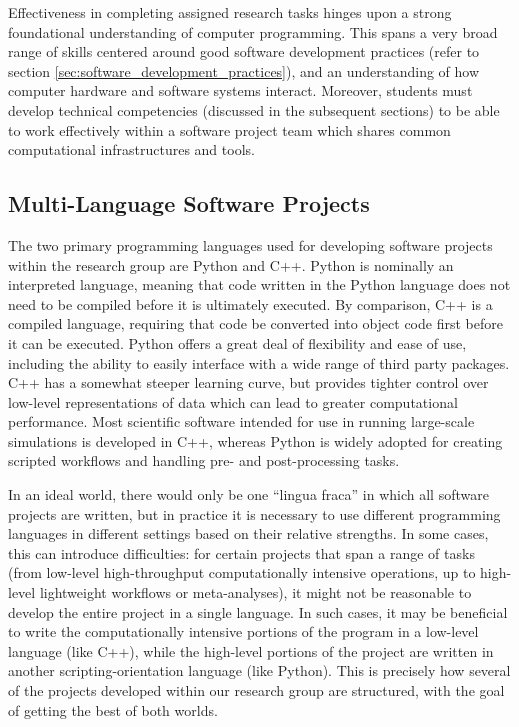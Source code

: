\documentclass[12pt,a4paper,article,oneside]{memoir} %
\begin{document}
Effectiveness in completing assigned research tasks hinges upon a strong foundational understanding of computer programming. This spans a very broad range of skills centered around good software development practices (refer to section \ref{sec:software_development_practices}), and an understanding of how computer hardware and software systems interact. Moreover, students must develop technical competencies (discussed in the subsequent sections) to be able to work effectively within a software project team which shares common computational infrastructures and tools.

\subsection{Multi-Language Software Projects}

The two primary programming languages used for developing software projects within the research group are Python and C++. Python is nominally an interpreted language, meaning that code written in the Python language does not need to be compiled before it is ultimately executed. By comparison, C++ is a compiled language, requiring that code be converted into object code first before it can be executed. Python offers a great deal of flexibility and ease of use, including the ability to easily interface with a wide range of third party packages. C++ has a somewhat steeper learning curve, but provides tighter control over low-level representations of data which can lead to greater computational performance. Most scientific software intended for use in running large-scale simulations is developed in C++, whereas Python is widely adopted for creating scripted workflows and handling pre- and post-processing tasks.

In an ideal world, there would only be one ``lingua fraca'' in which all software projects are written, but in practice it is necessary to use different programming languages in different settings based on their relative strengths. In some cases, this can introduce difficulties: for certain projects that span a range of tasks (from low-level high-throughput computationally intensive operations, up to high-level lightweight workflows or meta-analyses), it might not be reasonable to develop the entire project in a single language. In such cases, it may be beneficial to write the computationally intensive portions of the program in a low-level language (like C++), while the high-level portions of the project are written in another scripting-orientation language (like Python). This is precisely how several of the projects developed within our research group are structured, with the goal of getting the best of both worlds.
\end{document}
